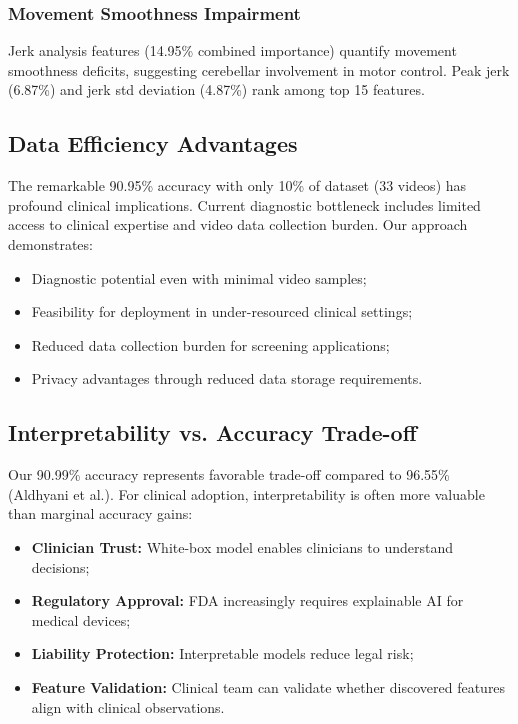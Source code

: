 \documentclass[conference]{IEEEtran}
\begin{document}
\subsubsection{Movement Smoothness Impairment}

Jerk analysis features (14.95\% combined importance) quantify movement smoothness deficits, suggesting cerebellar involvement in motor control. Peak jerk (6.87\%) and jerk std deviation (4.87\%) rank among top 15 features.

\subsection{Data Efficiency Advantages}

The remarkable 90.95\% accuracy with only 10\% of dataset (33 videos) has profound clinical implications. Current diagnostic bottleneck includes limited access to clinical expertise and video data collection burden. Our approach demonstrates:

\begin{itemize}
\item Diagnostic potential even with minimal video samples;
\item Feasibility for deployment in under-resourced clinical settings;
\item Reduced data collection burden for screening applications;
\item Privacy advantages through reduced data storage requirements.
\end{itemize}

\subsection{Interpretability vs. Accuracy Trade-off}

Our 90.99\% accuracy represents favorable trade-off compared to 96.55\% (Aldhyani et al.). For clinical adoption, interpretability is often more valuable than marginal accuracy gains:

\begin{itemize}
\item \textbf{Clinician Trust:} White-box model enables clinicians to understand decisions;
\item \textbf{Regulatory Approval:} FDA increasingly requires explainable AI for medical devices;
\item \textbf{Liability Protection:} Interpretable models reduce legal risk;
\item \textbf{Feature Validation:} Clinical team can validate whether discovered features align with clinical observations.
\end{itemize}
\end{document}
